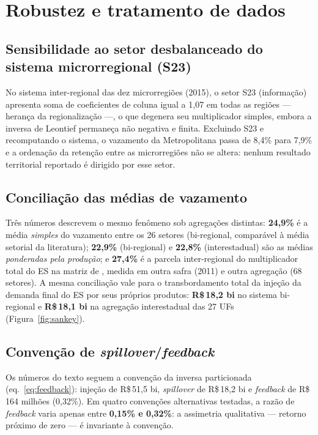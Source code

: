 \documentclass[11pt,a4paper]{article}
\begin{document}
\section{Robustez e tratamento de dados}
\label{ap:robustez}

\subsection{Sensibilidade ao setor desbalanceado do sistema microrregional (S23)}
\label{ap:s23}
No sistema inter-regional das dez microrregiões (2015), o setor S23 (informação) apresenta
soma de coeficientes de coluna igual a 1,07 em todas as regiões --- herança da
regionalização ---, o que degenera seu multiplicador simples, embora a inversa de Leontief
permaneça não negativa e finita. Excluindo S23 e recomputando o sistema, o vazamento da
Metropolitana passa de 8,4\% para 7,9\% e a ordenação da retenção entre as microrregiões
não se altera: nenhum resultado territorial reportado é dirigido por esse setor.

\subsection{Conciliação das médias de vazamento}
\label{ap:medias}
Três números descrevem o mesmo fenômeno sob agregações distintas: \textbf{24,9\%} é a média
\emph{simples} do vazamento entre os 26 setores (bi-regional, comparável à média setorial
da literatura); \textbf{22,9\%} (bi-regional) e \textbf{22,8\%} (interestadual) são as
médias \emph{ponderadas pela produção}; e \textbf{27,4\%} é a parcela inter-regional do
multiplicador total do ES na matriz de \citet{haddad2017iioas}, medida em outra safra
(2011) e outra agregação (68 setores). A mesma conciliação vale para o transbordamento
total da injeção da demanda final do ES por seus próprios produtos: \textbf{R\$\,18,2 bi}
no sistema bi-regional e \textbf{R\$\,18,1 bi} na agregação interestadual das 27 UFs
(Figura~\ref{fig:sankey}).

\subsection{Convenção de \emph{spillover}/\emph{feedback}}
\label{ap:convencao}
Os números do texto seguem a convenção da inversa particionada
(eq.~\ref{eq:feedback}): injeção de R\$\,51,5 bi, \emph{spillover} de R\$\,18,2 bi e
\emph{feedback} de R\$\,164 milhões (0,32\%). Em quatro convenções alternativas testadas, a
razão de \emph{feedback} varia apenas entre \textbf{0,15\% e 0,32\%}: a assimetria
qualitativa --- retorno próximo de zero --- é invariante à convenção.
\end{document}
